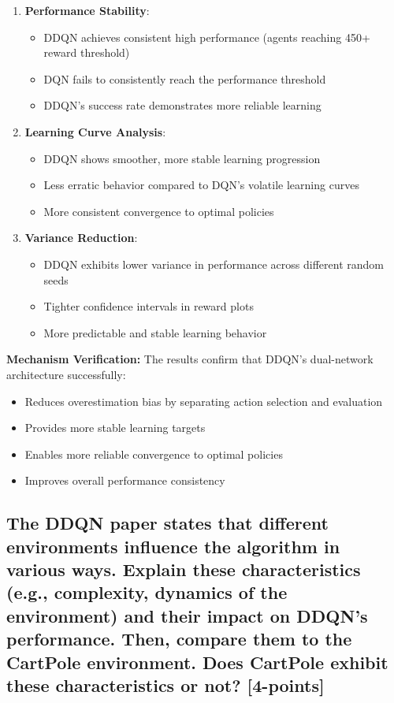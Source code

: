 \documentclass[12pt]{article}
\begin{document}
{{{\begin{enumerate}
    \item \textbf{Performance Stability}:
    \begin{itemize}
        \item DDQN achieves consistent high performance (agents reaching 450+ reward threshold)
        \item DQN fails to consistently reach the performance threshold
        \item DDQN's success rate demonstrates more reliable learning
    \end{itemize}
    
    \item \textbf{Learning Curve Analysis}:
    \begin{itemize}
        \item DDQN shows smoother, more stable learning progression
        \item Less erratic behavior compared to DQN's volatile learning curves
        \item More consistent convergence to optimal policies
    \end{itemize}
    
    \item \textbf{Variance Reduction}:
    \begin{itemize}
        \item DDQN exhibits lower variance in performance across different random seeds
        \item Tighter confidence intervals in reward plots
        \item More predictable and stable learning behavior
    \end{itemize}
\end{enumerate}

\textbf{Mechanism Verification:}
The results confirm that DDQN's dual-network architecture successfully:
\begin{itemize}
    \item Reduces overestimation bias by separating action selection and evaluation
    \item Provides more stable learning targets
    \item Enables more reliable convergence to optimal policies
    \item Improves overall performance consistency
\end{itemize}

\subsection{The DDQN paper states that different environments influence the algorithm in various ways. Explain these characteristics (e.g., complexity, dynamics of the environment) and their impact on DDQN's performance. Then, compare them to the CartPole environment. Does CartPole exhibit these characteristics or not? [4-points]}

}}}
\end{document}

